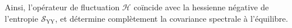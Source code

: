 Ainsi, l’opérateur de fluctuation \(\mathcal{H}\) coïncide avec la hessienne négative de l'entropie \(\mathcal{S}_{\mathrm{YY}}\), et détermine complètement la covariance spectrale à l’équilibre.


%
%
%

